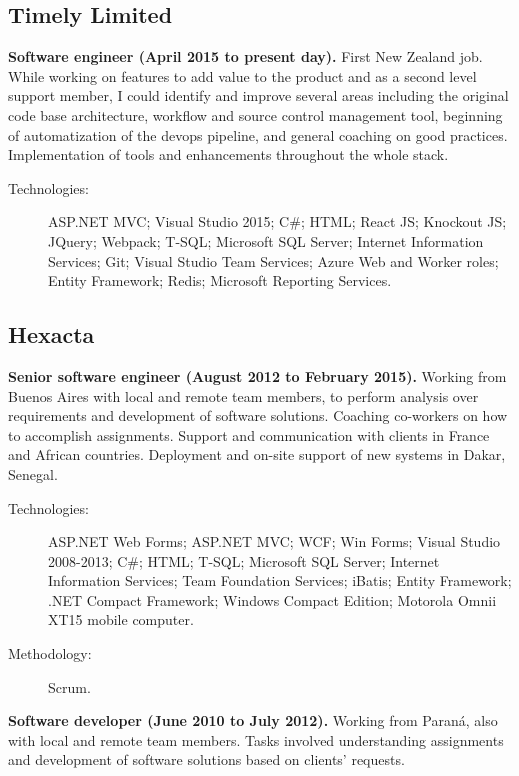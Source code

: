 \subsection*{Timely Limited}

\textbf{Software engineer (April 2015 to present day).} First New Zealand job. While working on features to add value to the product and as a second level support member, I could identify and improve several areas including the original code base architecture, workflow and source control management tool, beginning of automatization of the devops pipeline, and general coaching on good practices. Implementation of tools and enhancements throughout the whole stack.

\begin{description}
    \item[Technologies:] ASP.NET MVC; Visual Studio 2015; C\#; HTML; React JS; Knockout JS; JQuery; Webpack; T-SQL; Microsoft SQL Server; Internet Information Services; Git; Visual Studio Team Services; Azure Web and Worker roles; Entity Framework; Redis; Microsoft Reporting Services.
\end{description}

\subsection*{Hexacta}

\textbf{Senior software engineer (August 2012 to February 2015).} Working from Buenos Aires with local and remote team members, to perform analysis over requirements and development of software solutions. Coaching co-workers on how to accomplish assignments. Support and communication with clients in France and African countries. Deployment and on-site support of new systems in Dakar, Senegal.

\begin{description}
    \item[Technologies:] ASP.NET Web Forms; ASP.NET MVC; WCF; Win Forms; Visual Studio 2008-2013; C\#; HTML; T-SQL; Microsoft SQL Server; Internet Information Services; Team Foundation Services; iBatis; Entity Framework; .NET Compact Framework; Windows Compact Edition; Motorola Omnii XT15 mobile computer.
    \item[Methodology:] Scrum.
\end{description}

\textbf{Software developer (June 2010 to July 2012).} Working from Paraná, also with local and remote team members. Tasks involved understanding assignments and development of software solutions based on clients' requests.

